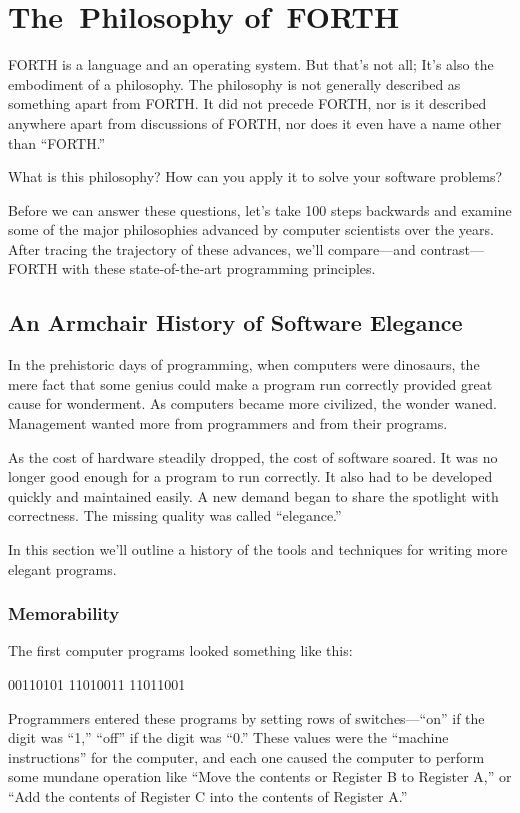 

\chapter{The~Philosophy of~FORTH}

FORTH is a language and an operating system. But that's not all; It's
also the embodiment of a philosophy. The philosophy is not generally
described as something apart from FORTH. It did not precede FORTH, nor
is it described anywhere apart from discussions of FORTH, nor does it
even have a name other than ``FORTH.''

What is this philosophy? How can you apply it to solve your software
problems?

Before we can answer these questions, let's take 100 steps backwards
and examine some of the major philosophies advanced by computer
scientists over the years. After tracing the trajectory of these
advances, we'll compare---and contrast---FORTH with these
state-of-the-art programming principles.


\section{An Armchair History of Software Elegance}

In the prehistoric days of programming, when computers were dinosaurs,
the mere fact that some genius could make a program run correctly
provided great cause for wonderment. As computers became more
civilized, the wonder waned. Management wanted more from programmers
and from their programs.

As the cost of hardware steadily dropped, the cost of software soared.
It was no longer good enough for a program to run correctly. It also
had to be developed quickly and maintained easily. A new demand began
to share the spotlight with correctness.  The missing quality was
called ``elegance.''

In this section we'll outline a history of the tools and techniques
for writing more elegant programs.

\subsection{Memorability}
The first computer programs looked something like this:
\begin{Code}
00110101
11010011
11011001
\end{Code}
Programmers entered these programs by setting rows of
switches---``on'' if the digit was ``1,'' ``off'' if the digit was ``0.''
These values were the ``machine instructions'' for the computer, and
each one caused the computer to perform some mundane operation like
``Move the contents or Register B to Register A,'' or ``Add the
contents of Register C into the contents of Register A.''

